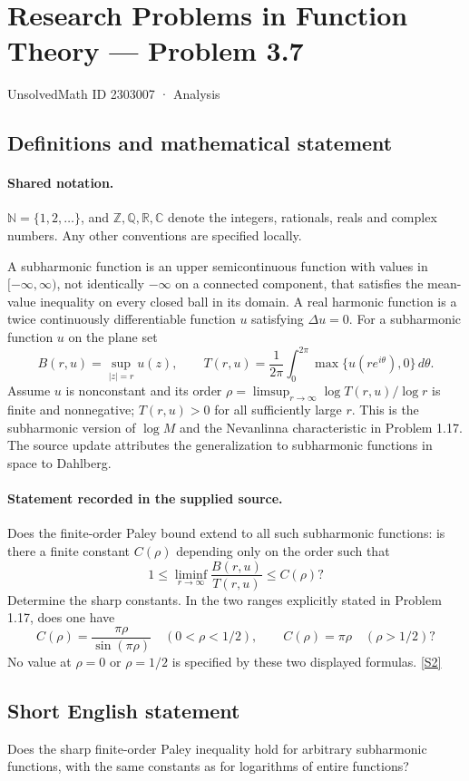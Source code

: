 \documentclass[11pt]{article}
\newcommand{\sref}[2]{\hyperlink{source:#1:#2}{[S#2]}}
\begin{document}
\setcounter{section}{2303006}
\section{Research Problems in Function Theory — Problem 3.7}\label{2303007}
{\small\sffamily UnsolvedMath ID 2303007 · Analysis}
\subsection{Definitions and mathematical statement}

\paragraph{Shared notation.}$\mathbb N=\{1,2,\ldots\}$, and $\mathbb Z,\mathbb Q,\mathbb R,\mathbb C$ denote the integers, rationals, reals and complex numbers. Any other conventions are specified locally.


A subharmonic function is an upper semicontinuous function with values in $[-\infty,\infty)$, not identically $-\infty$ on a connected component, that satisfies the mean-value inequality on every closed ball in its domain. A real harmonic function is a twice continuously differentiable function $u$ satisfying $\Delta u=0$. For a subharmonic function $u$ on the plane set
\[B(r,u)=\sup_{|z|=r}u(z),\qquad T(r,u)=\frac1{2\pi}\int_0^{2\pi}\max\{u(re^{i\theta}),0\}\,d\theta.\]
Assume $u$ is nonconstant and its order $\rho=\limsup_{r\to\infty}\log T(r,u)/\log r$ is finite and nonnegative; $T(r,u)>0$ for all sufficiently large $r$. This is the subharmonic version of $\log M$ and the Nevanlinna characteristic in Problem 1.17.
The source update attributes the generalization to subharmonic functions in space to Dahlberg.
\paragraph{Statement recorded in the supplied source.}
Does the finite-order Paley bound extend to all such subharmonic functions: is there a finite constant $C(\rho)$ depending only on the order such that
\[1\leq\liminf_{r\to\infty}\frac{B(r,u)}{T(r,u)}\leq C(\rho)?\]
Determine the sharp constants. In the two ranges explicitly stated in Problem 1.17, does one have
\[C(\rho)=\frac{\pi\rho}{\sin(\pi\rho)}\quad(0<\rho<1/2),\qquad C(\rho)=\pi\rho\quad(\rho>1/2)?\]
No value at $\rho=0$ or $\rho=1/2$ is specified by these two displayed formulas. \sref{2303007}{2}
\subsection{Short English statement}
Does the sharp finite-order Paley inequality hold for arbitrary subharmonic functions, with the same constants as for logarithms of entire functions?
\end{document}
